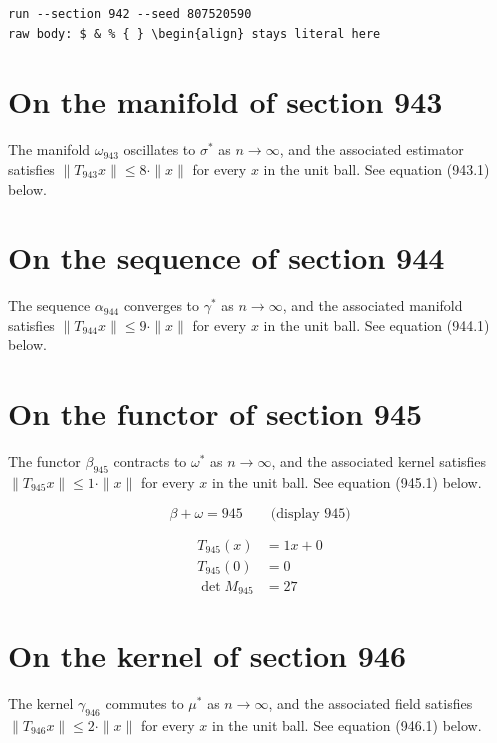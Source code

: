 \documentclass{article}
\begin{document}
\begin{verbatim}
run --section 942 --seed 807520590
raw body: $ & % { } \begin{align} stays literal here
\end{verbatim}

\section{On the manifold of section 943}
The manifold $\omega_{943}$ oscillates to $\sigma^{*}$ as $n \to \infty$,
and the associated estimator satisfies $\|T_{943} x\| \leq 8 \cdot \|x\|$
for every $x$ in the unit ball. See equation (943.1) below.

\section{On the sequence of section 944}
The sequence $\alpha_{944}$ converges to $\gamma^{*}$ as $n \to \infty$,
and the associated manifold satisfies $\|T_{944} x\| \leq 9 \cdot \|x\|$
for every $x$ in the unit ball. See equation (944.1) below.

\section{On the functor of section 945}
The functor $\beta_{945}$ contracts to $\omega^{*}$ as $n \to \infty$,
and the associated kernel satisfies $\|T_{945} x\| \leq 1 \cdot \|x\|$
for every $x$ in the unit ball. See equation (945.1) below.

$$
\beta + \omega = 945 \qquad \text{(display 945)}
$$

\begin{align}
T_{945}(x) &= 1 x + 0 \\
T_{945}(0) &= 0 \\
\det M_{945} &= 27
\end{align}

\section{On the kernel of section 946}
The kernel $\gamma_{946}$ commutes to $\mu^{*}$ as $n \to \infty$,
and the associated field satisfies $\|T_{946} x\| \leq 2 \cdot \|x\|$
for every $x$ in the unit ball. See equation (946.1) below.
\end{document}
